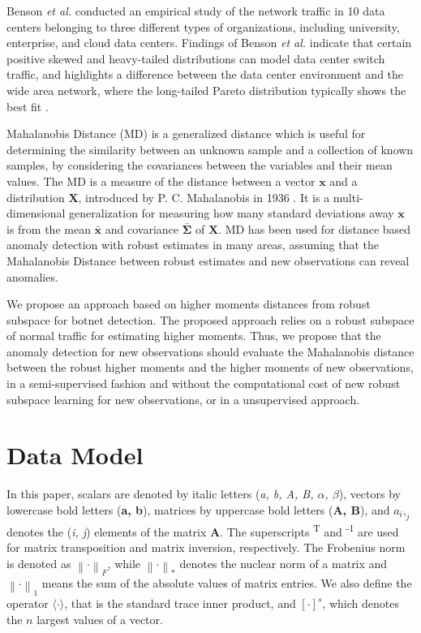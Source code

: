 Benson \emph{et al.} \cite{benson2010network} conducted an empirical study of the network traffic in 10 data centers belonging to three different types of organizations, including university, enterprise, and cloud data centers. Findings of Benson \emph{et al.} indicate that certain positive skewed and heavy-tailed distributions can model data center switch traffic, and highlights a difference between the data center environment and the wide area network, where the long-tailed Pareto distribution typically shows the best fit \cite{benson2010network}.

Mahalanobis Distance (MD) is a generalized distance which is useful for determining the similarity between an unknown sample and a collection of known samples, by considering the covariances between the variables and their mean values. The MD is a measure of the distance between a vector $\boldsymbol{x}$ and a distribution $\boldsymbol{X}$, introduced by P. C. Mahalanobis in 1936 \cite{mahalanobis1936md}. It is a multi-dimensional generalization for measuring how many standard deviations away $\boldsymbol{x}$ is from the mean $\boldsymbol{\bar{x}}$ and covariance $\boldsymbol{\bar{\Sigma}}$ of $\boldsymbol{X}$. MD has been used for distance based anomaly detection with robust estimates in many areas, assuming that the Mahalanobis Distance between robust estimates and new observations can reveal anomalies.

We propose an approach based on higher moments distances from robust subspace for botnet detection. The proposed approach relies on a robust subspace of normal traffic for estimating higher moments. Thus, we propose that the anomaly detection for new observations should evaluate the Mahalanobis distance between the robust higher moments and the higher moments of new observations, in a semi-supervised fashion and without the computational cost of new robust subspace learning for new observations, or in a unsupervised approach. 


\section{Data Model}
\label{sec:4_datamodel}

In this paper, scalars are denoted by italic letters (\emph{a, b, A, B, $\alpha$, $\beta$}), vectors by lowercase bold letters (\textbf{a, b}), matrices by uppercase bold letters (\textbf{A, B}), and $a_i,_j$ denotes the (\emph{i, j}) elements of the matrix \textbf{A}. The superscripts \textsuperscript{T} and \textsuperscript{-1} are used for matrix transposition and matrix inversion, respectively. The Frobenius norm is denoted as $\left\| \mathord{\cdot} \right\|_F$, while $\left\| \mathord{\cdot} \right\|_*$ denotes the nuclear norm of a matrix and $\left\| \mathord{\cdot} \right\|_1$ means the sum of the absolute values of matrix entries. We also define the operator $\langle \mathord{\cdot} \rangle$, that is the standard trace inner product, and $[ \mathord{\cdot} ]^s$, which denotes the $n$ largest values of a vector.

